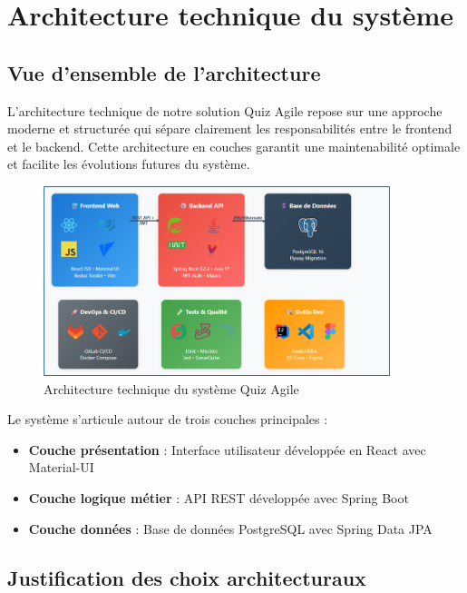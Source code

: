 \documentclass[12pt,a4paper]{report}
\begin{document}
\section{Architecture technique du système}

\subsection{Vue d'ensemble de l'architecture}

L'architecture technique de notre solution Quiz Agile repose sur une approche moderne et structurée qui sépare clairement les responsabilités entre le frontend et le backend. Cette architecture en couches garantit une maintenabilité optimale et facilite les évolutions futures du système.

\begin{figure}[H]
\centering
\includegraphics[width=0.9\textwidth]{latex_media/media/architecture_technique_systeme.png}
\caption{Architecture technique du système Quiz Agile}
\label{fig:architecture-technique}
\end{figure}

Le système s'articule autour de trois couches principales :

\begin{itemize}
    \item \textbf{Couche présentation} : Interface utilisateur développée en React avec Material-UI
    \item \textbf{Couche logique métier} : API REST développée avec Spring Boot
    \item \textbf{Couche données} : Base de données PostgreSQL avec Spring Data JPA
\end{itemize}

\subsection{Justification des choix architecturaux}
\end{document}
